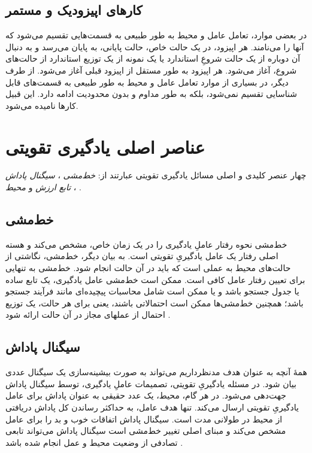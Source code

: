 \subsection{کارهای اپیزودیک و مستمر}
در بعضی موارد، تعامل عامل و محیط به طور طبیعی به قسمت‌هایی تقسیم می‌شود که آن\nf ها را 
\textit{}
می‌نامند. هر اپیزود، در یک حالت خاص، حالت پایانی، به پایان می‌رسد و به دنبال آن دوباره از یک حالت شروعِ استاندارد یا یک نمونه از یک توزیع استاندارد از حالت‌های شروع، آغاز می‌شود. هر اپیزود به طور مستقل از اپیزود قبلی آغاز می‌شود.
از طرف دیگر، در بسیاری از موارد تعامل عامل و محیط به طور طبیعی به قسمت‌های قابل شناسایی تقسیم نمی‌شود، بلکه به طور مداوم و بدون محدودیت ادامه دارد. این قبیل کارها 
\textit{
}
 نامیده می‌شود.


\section{عناصر اصلی یادگیری تقویتی}
چهار عنصر کلیدی و اصلی مسائل یادگیری تقویتی عبارتند از:
\textit{خط‌مشی} ، 
\textit{سیگنال پاداش} ،
\textit{تابع ارزش}  
و
\textit{محیط} .
\subsection{خط‌مشی}
خط‌مشی نحوه رفتار عاملِ یادگیری را در یک زمان خاص، مشخص می‌کند و هسته اصلی رفتار یک عامل یادگیریِ تقویتی است. به بیان دیگر، خط‌مشی، نگاشتی از حالت‌های محیط به عملی است که باید در آن حالت انجام شود. خط‌مشی به تنهایی برای تعیین رفتار عامل کافی است. ممکن است
خط‌مشی عامل یادگیری، یک تابع ساده یا جدول جستجو باشد و یا ممکن است شامل محاسبات پیچیده‌ای مانند فرآیند جستجو باشد؛ همچنین
خط‌مشی‌ها ممکن است احتمالاتی باشند، یعنی برای هر حالت، یک توزیع احتمال از عمل\nf های مجاز در آن حالت ارائه شود
\cite{suttonbook}.


\subsection{سیگنال پاداش}

همهٔ آنچه به عنوان هدف مدنظرداریم می‌تواند به صورت بیشینه‌سازی  یک سیگنال عددی بیان شود. در مسئله یادگیریِ تقویتی، تصمیمات عاملِ یادگیری، توسط سیگنال پاداش جهت‌دهی می‌شود. در هر گام، محیط، یک عدد حقیقی به عنوان پاداش برای عامل یادگیریِ تقویتی ارسال می‌کند. تنها هدف عامل، به حداکثر رساندن کل پاداش دریافتی از محیط در طولانی مدت است. سیگنال پاداش اتفاقات خوب و بد را برای عامل مشخص می‌کند و مبنای اصلی تغییر خط‌مشی است
سیگنال پاداش می‌تواند تابعی تصادفی از وضعیت محیط و عمل انجام شده باشد
\cite{suttonbook}.

